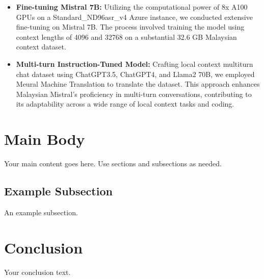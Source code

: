 \documentclass{article}
\begin{document}
\begin{itemize}
    \item \textbf{Fine-tuning Mistral 7B:} Utilizing the computational power of 8x A100 GPUs on a Standard\_ND96asr\_v4 Azure instance, we conducted extensive fine-tuning on Mistral 7B. The process involved training the model using context lengths of 4096 and 32768 on a substantial 32.6 GB Malaysian context dataset.

    \item \textbf{Multi-turn Instruction-Tuned Model:} Crafting local context multiturn chat dataset using ChatGPT3.5, ChatGPT4, and Llama2 70B, we employed Meural Machine Translation to translate the dataset. This approach enhances Malaysian Mistral's proficiency in multi-turn conversations, contributing to its adaptability across a wide range of local context tasks and coding.
\end{itemize}

\section{Main Body}
Your main content goes here. Use sections and subsections as needed.

\subsection{Example Subsection}
An example subsection.

\section{Conclusion}
Your conclusion text.

% 
% 
\end{document}
